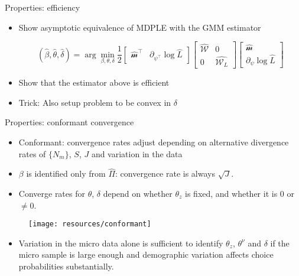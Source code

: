 \begin{frame}{Properties: efficiency}

\begin{itemize}
\item Show asymptotic equivalence of MDPLE with the GMM estimator

\begin{equation}
    (\hat{\beta},\hat{\theta},\hat{\delta}) = \arg\min_{\beta,\theta,\delta}\frac{1}{2}\begin{bmatrix}
\hat{\mathcal{m}}^\intercal & \partial_{\psi^\intercal}\log\hat{L}
\end{bmatrix}
\begin{bmatrix}
\hat{\mathcal{W}} & 0\\
0 & \hat{\mathcal{W}_L}
\end{bmatrix}
\begin{bmatrix}
\hat{\mathcal{m}} \\ \partial_{\psi}\log\hat{L}
\end{bmatrix}
\end{equation}

\item Show that the estimator above is efficient
\item  Trick: Also setup problem to be convex in $\delta$
\end{itemize}

\end{frame}

\begin{frame}{Properties: conformant convergence}
    
    \begin{itemize}
        \item Conformant: convergence rates adjust depending on alternative divergence rates of $\{N_m\}$, $S$, $J$ and variation in the data
        \item $\beta$ is identified only from $\hat{\Pi}$: convergence rate is always $\sqrt{J}$.
        \item Converge rates for $\theta$, $\delta$ depend on whether $\theta_z$ is fixed, and whether it is 0 or $\neq 0$.
    \end{itemize}
    
    \begin{figure}[htbp]
    \begin{center}
    \texttt{[image: resources/conformant]}
    \label{default}
    \end{center}
    \end{figure}

    \begin{itemize}
        \item Variation in the micro data alone is sufficient to identify $\theta_z$, $\theta^\nu$ and $\delta$ if the micro sample is large enough and demographic variation affects choice probabilities substantially.
    \end{itemize}
\end{frame}



